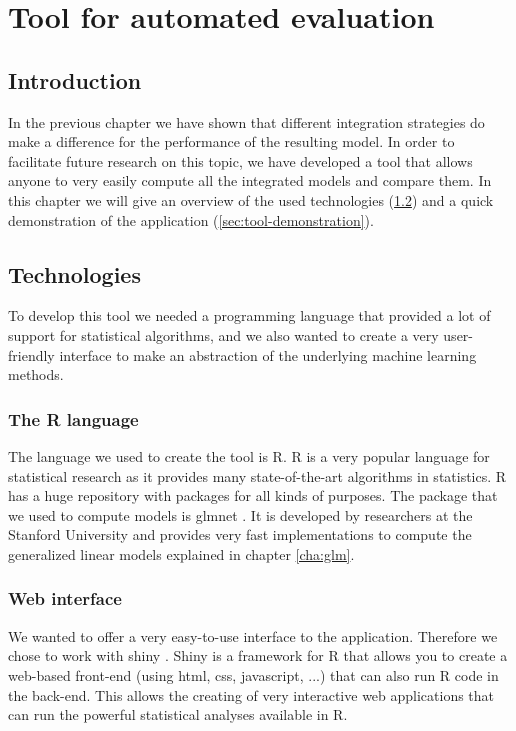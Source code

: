 \chapter{Tool for automated evaluation}
\label{cha:tool}

\section{Introduction}
\label{sec:tool-introduction}
In the previous chapter we have shown that different integration strategies do make a difference for the performance of the resulting model. In order to facilitate future research on this topic, we have developed a tool that allows anyone to very easily compute all the integrated models and compare them. In this chapter we will give an overview of the used technologies (\ref{sec:tool-technologies}) and a quick demonstration of the application (\ref{sec:tool-demonstration}).
\section{Technologies}
\label{sec:tool-technologies}
To develop this tool we needed a programming language that provided a lot of support for statistical algorithms, and we also wanted to create a very user-friendly interface to make an abstraction of the underlying machine learning methods.
\subsection{The R language}
The language we used to create the tool is R. R is a very popular language for statistical research as it provides many state-of-the-art algorithms in statistics. R has a huge repository with packages for all kinds of purposes. The package that we used to compute models is glmnet \cite{glmnetvignette}. It is developed by researchers at the Stanford University and provides very fast implementations to compute the generalized linear models explained in chapter \ref{cha:glm}. 
\subsection{Web interface}
We wanted to offer a very easy-to-use interface to the application. Therefore we chose to work with shiny \cite{shiny}. Shiny is a framework for R that allows you to create a web-based front-end (using html, css, javascript, ...) that can also run R code in the back-end. This allows the creating of very interactive web applications that can run the powerful statistical analyses available in R.
